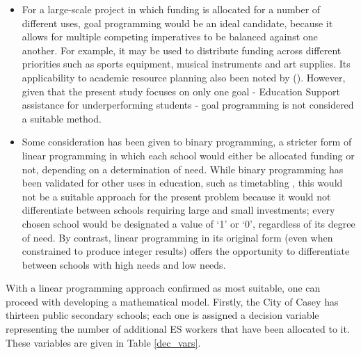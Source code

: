 \documentclass[11pt, a4paper]{article}
\begin{document}
    \begin{itemize}
        \item For a large-scale project in which funding is allocated for a number of different uses, goal programming would be an ideal candidate, because it allows for multiple competing imperatives to be balanced against one another. For example, it may be used to distribute funding across different priorities such as sports equipment, musical instruments and art supplies. Its applicability to academic resource planning also been noted by  (). However, given that the present study focuses on only one goal - Education Support assistance for underperforming students - goal programming is not considered a suitable method.
        \item Some consideration has been given to binary programming, a stricter form of linear programming in which each school would either be allocated funding or not, depending on a determination of need. While binary programming has been validated for other uses in education, such as timetabling \parencite{binary_prog}, this would not be a suitable approach for the present problem because it would not differentiate between schools requiring large and small investments; every chosen school would be designated a value of `1' or `0', regardless of its degree of need. By contrast, linear programming in its original form (even when constrained to produce integer results) offers the opportunity to differentiate between schools with high needs and low needs.
    \end{itemize}

    With a linear programming approach confirmed as most suitable, one can proceed with developing a mathematical model. Firstly, the City of Casey has thirteen public secondary schools; each one is assigned a decision variable representing the number of additional ES workers that have been allocated to it. These variables are given in Table \ref{dec_vars}.
\end{document}
